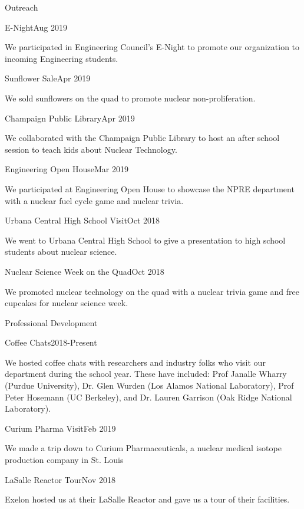 \documentclass{resume2} %
\begin{document}
\begin{rSection}{Outreach}
	\begin{rSubsection}{E-Night}{Aug 2019}{}{}
		\item We participated in Engineering Council's E-Night to promote our 
		organization to incoming Engineering students.  
	\end{rSubsection}
	\begin{rSubsection}{Sunflower Sale}{Apr 2019}{}{}
		\item We sold sunflowers on the quad to promote nuclear non-proliferation. 
	\end{rSubsection}
	\begin{rSubsection}{Champaign Public Library}{Apr 2019}{}{}
		\item We collaborated with the Champaign Public Library to host
		an after school session to teach kids about Nuclear Technology. 
	\end{rSubsection}
	\begin{rSubsection}{Engineering Open House}{Mar 2019}{}{}
		\item We participated at Engineering Open House to showcase 
		the NPRE department with a nuclear fuel cycle game and nuclear trivia. 
	\end{rSubsection}
	\begin{rSubsection}{Urbana Central High School Visit}{Oct 2018}{}{}
		\item We went to Urbana Central High School to give a presentation 
		to high school students about nuclear science. 
	\end{rSubsection}
	\begin{rSubsection}{Nuclear Science Week on the Quad}{Oct 2018}{}{}
		\item We promoted nuclear technology on the quad with a
		nuclear trivia game and free cupcakes for nuclear science week.
	\end{rSubsection}
\end{rSection}

\begin{rSection}{Professional Development}
	\begin{rSubsection}{Coffee Chats}{2018-Present}{}{}
		\item We hosted coffee chats with researchers and industry folks who 
		visit our department during the school year. These have included: 
		Prof Janalle Wharry (Purdue University), 
		Dr. Glen Wurden (Los Alamos National Laboratory), 
		Prof Peter Hosemann (UC Berkeley), 
		and Dr. Lauren Garrison (Oak Ridge National Laboratory). 
	\end{rSubsection}
	\begin{rSubsection}{Curium Pharma Visit}{Feb 2019}{}{}
		\item We made a trip down to Curium Pharmaceuticals, 
		a nuclear medical isotope production company in St. Louis
	\end{rSubsection}
	\begin{rSubsection}{LaSalle Reactor Tour}{Nov 2018}{}{}
		\item Exelon hosted us at their LaSalle Reactor and gave us a 
		tour of their facilities. 
	\end{rSubsection}
\end{rSection}


\end{document}
